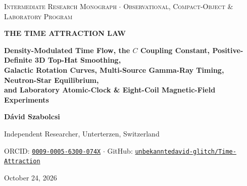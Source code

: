 \documentclass[10pt,a4paper]{article}
\begin{document}
\thispagestyle{empty}
\vspace*{1mm}
\noindent{\color{navy}\rule{\linewidth}{2pt}}\par\vspace{1.5mm}
\begin{center}
  {\footnotesize\scshape\color{slate}Intermediate Research Monograph $\cdot$ Observational, Compact-Object \& Laboratory Program}\par\vspace{1.5mm}
  {\LARGE\bfseries\color{navy}THE TIME ATTRACTION LAW}\par\vspace{2mm}
  {\large\bfseries\color{slate}Density-Modulated Time Flow, the $C$ Coupling Constant, Positive-Definite 3D Top-Hat Smoothing,}\\
  {\large\bfseries\color{slate}Galactic Rotation Curves, Multi-Source Gamma-Ray Timing, Neutron-Star Equilibrium,}\\
  {\large\bfseries\color{slate}and Laboratory Atomic-Clock \& Eight-Coil Magnetic-Field Experiments}\par\vspace{2mm}
  {\normalsize\bfseries D\'avid Szabolcsi}\par\vspace{1mm}
  {\small Independent Researcher, Unterterzen, Switzerland}\par
  {\small ORCID: \href{https://orcid.org/0009-0005-6300-074X}{\texttt{0009-0005-6300-074X}} $\cdot$ GitHub: \href{https://github.com/unbekanntedavid-glitch/Time-Attraction}{\texttt{unbekanntedavid-glitch/Time-Attraction}}}\par
  {\small October 24, 2026}
\end{center}
\vspace{1.5mm}
\noindent{\color{navy}\rule{\linewidth}{0.8pt}}\par\vspace{2mm}
\end{document}
